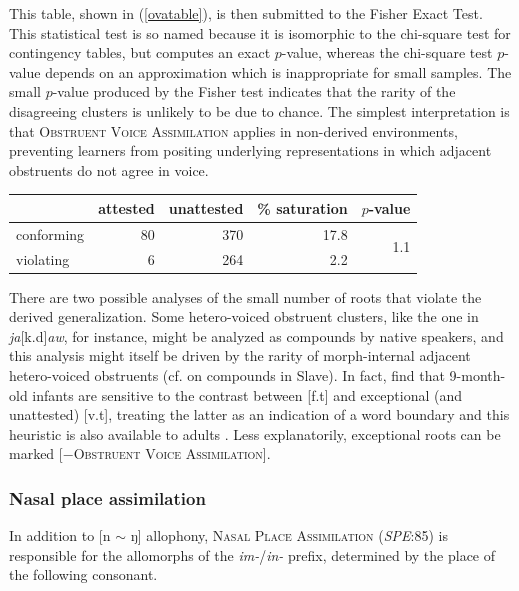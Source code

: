 This table, shown in (\ref{ovatable}), is then submitted to the Fisher Exact Test. This statistical test is so named because it is isomorphic to the chi-square test 
for contingency tables, but computes an exact $p$-value, whereas the chi-square test $p$-value depends on an approximation which is inappropriate for small samples. The small $p$-value produced by the Fisher test indicates that the rarity of the disagreeing clusters is unlikely to be due to chance. The simplest interpretation is that \textsc{Obstruent Voice Assimilation} applies in non-derived environments, preventing learners from positing underlying representations in which adjacent obstruents do not agree in voice.

\begin{example} \label{ovatable}
\begin{tabular}{l r r r r}
\toprule
           & attested & unattested & \% saturation & $p$-value                   \\
\midrule
conforming & 80       & 370        & 17.8          & \multirow{2}{*}{1.1\e{-11}} \\
violating  &  6       & 264        & 2.2           \\
\bottomrule
\end{tabular}
\end{example}

There are two possible analyses of the small number of roots that violate the derived generalization. Some hetero-voiced obstruent clusters, like the one in \emph{ja}[k.d]\emph{aw}, for instance, might be analyzed as compounds by native speakers, and this analysis might itself be driven by the rarity of morph-internal adjacent hetero-voiced obstruents (cf. \citealp[546]{Rice2009d} on compounds in Slave). In fact, \citet{Mattys2001b} find that 9-month-old infants are sensitive to the contrast between [f.t] and exceptional (and unattested) [v.t], treating the latter as an indication of a word boundary and this heuristic is also available to adults \citep{Brown1956,McQueen1998b}. Less explanatorily, exceptional roots can be marked [$-$\textsc{Obstruent Voice Assimilation}].

\subsubsection{Nasal place assimilation} 
\label{npa}

In addition to [n $\sim$ ŋ] allophony, \textsc{Nasal Place Assimilation} (\emph{SPE}:85) is responsible for the allomorphs of the \emph{im-}/\emph{in-} prefix, determined by the place of the following consonant.

